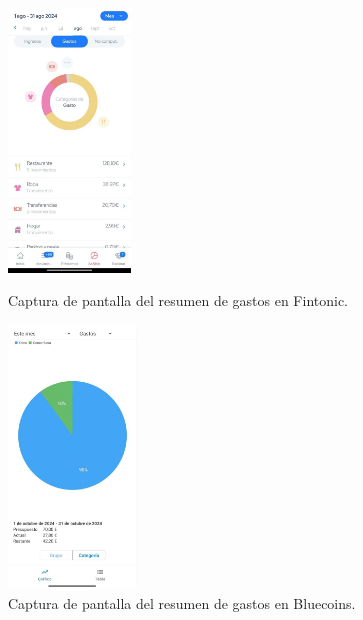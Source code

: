 \begin{figure}[ht!]
    \centering
    \begin{minipage}{0.45\textwidth}
        \centering
        \includegraphics[height = 70mm]{imagenes/resumen-gastos-mes-fintonic.jpg}
        \caption{Captura de pantalla del resumen de gastos en Fintonic.}
        \label{fig:resumen_gastos_mes_fintonic}
    \end{minipage}\hfill
    \begin{minipage}{0.45\textwidth}
        \centering
        \includegraphics[height = 70mm]{imagenes/resumen-gastos-bluecoins.jpg}
        \caption{Captura de pantalla del resumen de gastos en Bluecoins.}
        \label{fig:resumen_gastos_bluecoins}
    \end{minipage}
\end{figure}

